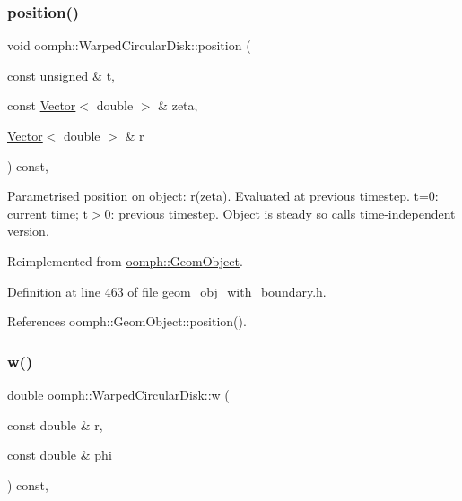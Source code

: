 \subsubsection{\texorpdfstring{position()}{position()}\hspace{0.1cm}{\footnotesize\ttfamily [2/2]}}
{\footnotesize\ttfamily void oomph\+::\+Warped\+Circular\+Disk\+::position (\begin{DoxyParamCaption}\item[{const unsigned \&}]{t,  }\item[{const \hyperlink{classoomph_1_1Vector}{Vector}$<$ double $>$ \&}]{zeta,  }\item[{\hyperlink{classoomph_1_1Vector}{Vector}$<$ double $>$ \&}]{r }\end{DoxyParamCaption}) const\hspace{0.3cm}{\ttfamily [inline]}, {\ttfamily [virtual]}}



Parametrised position on object\+: r(zeta). Evaluated at previous timestep. t=0\+: current time; t$>$0\+: previous timestep. Object is steady so calls time-\/independent version. 



Reimplemented from \hyperlink{classoomph_1_1GeomObject_ad44a736d23dcd63af163a7d80b5c4dfa}{oomph\+::\+Geom\+Object}.



Definition at line 463 of file geom\+\_\+obj\+\_\+with\+\_\+boundary.\+h.



References oomph\+::\+Geom\+Object\+::position().

\mbox{\label{classoomph_1_1WarpedCircularDisk_abbb6f07ee89b3b87fa2edfee44beb7c9}} 
\subsubsection{\texorpdfstring{w()}{w()}}
{\footnotesize\ttfamily double oomph\+::\+Warped\+Circular\+Disk\+::w (\begin{DoxyParamCaption}\item[{const double \&}]{r,  }\item[{const double \&}]{phi }\end{DoxyParamCaption}) const\hspace{0.3cm}{\ttfamily [inline]}, {\ttfamily [private]}}



